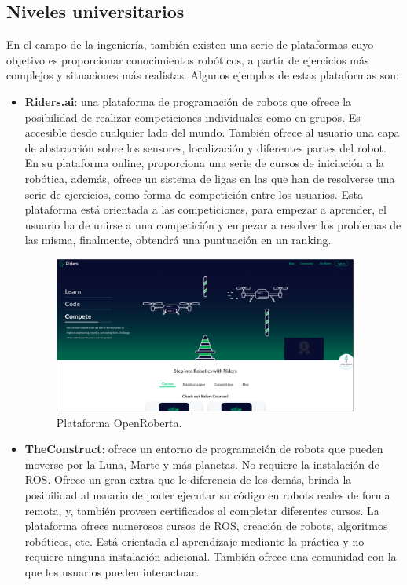\documentclass[a4paper, 12pt]{book}
\begin{document}
\subsection{Niveles universitarios}
En el campo de la ingeniería, también existen una serie de plataformas cuyo objetivo es proporcionar conocimientos robóticos, a partir de ejercicios más complejos y situaciones más realistas. Algunos ejemplos de estas plataformas son:
\begin{itemize}
\item \textbf{Riders.ai}: una plataforma de programación de robots que ofrece la posibilidad de realizar competiciones individuales como en grupos. Es accesible desde cualquier lado del mundo. También ofrece al usuario una capa de abstracción sobre los sensores, localización y diferentes partes del robot. En su plataforma online, proporciona una serie de cursos de iniciación a la robótica, además, ofrece un sistema de ligas en las que han de resolverse una serie de ejercicios, como forma de competición entre los usuarios. Esta plataforma está orientada a las competiciones, para empezar a aprender, el usuario ha de unirse a una competición y empezar a resolver los problemas de las misma, finalmente, obtendrá una puntuación en un ranking.

\begin{figure}[H]
	\centering
    \includegraphics[width=10cm]{img/ridersai.png}
    \caption{Plataforma OpenRoberta.}
\end{figure}

\item \textbf{TheConstruct}: ofrece un entorno de programación de robots que pueden moverse por la Luna, Marte y más planetas. No requiere la instalación de ROS. Ofrece un gran extra que le diferencia de los demás, brinda la posibilidad al usuario de poder ejecutar su código en robots reales de forma remota, y, también proveen certificados al completar diferentes cursos. La plataforma ofrece numerosos cursos de ROS, creación de robots, algoritmos robóticos, etc. Está orientada al aprendizaje mediante la práctica y no requiere ninguna instalación adicional. También ofrece una comunidad con la que los usuarios pueden interactuar.


\end{itemize}
\end{document}
